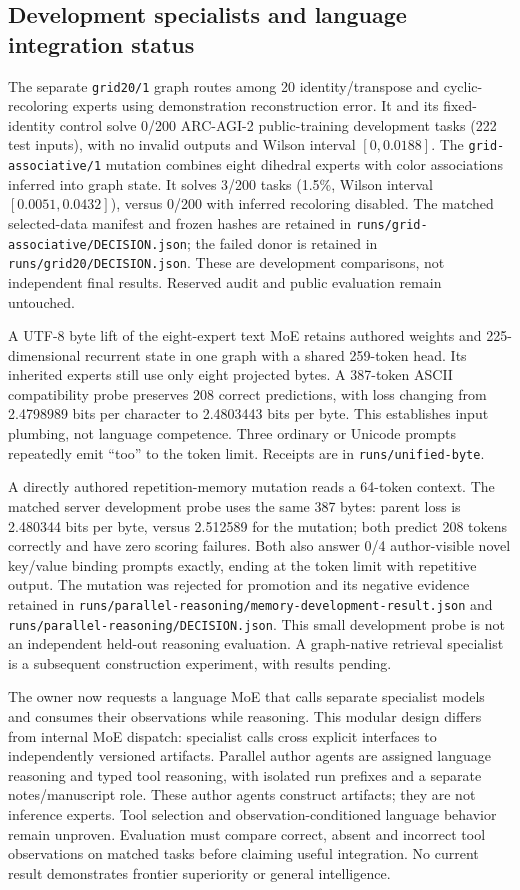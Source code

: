 \documentclass[11pt]{article}
\begin{document}
\subsection{Development specialists and language integration status}
The separate \texttt{grid20/1} graph routes among 20 identity/transpose and
cyclic-recoloring experts using demonstration reconstruction error. It and its
fixed-identity control solve 0/200 ARC-AGI-2 public-training development tasks
(222 test inputs), with no invalid outputs and Wilson interval $[0,0.0188]$.
The \texttt{grid-associative/1} mutation combines eight dihedral experts with
color associations inferred into graph state. It solves 3/200 tasks (1.5\%,
Wilson interval $[0.0051,0.0432]$), versus 0/200 with inferred recoloring disabled.
The matched selected-data manifest and frozen hashes are retained in
\texttt{runs/grid-associative/DECISION.json}; the failed donor is retained in
\texttt{runs/grid20/DECISION.json}. These are development comparisons, not
independent final results. Reserved audit and public evaluation remain untouched.

A UTF-8 byte lift of the eight-expert text MoE retains authored weights and
225-dimensional recurrent state in one graph with a shared 259-token head.
Its inherited experts still use only eight projected bytes. A 387-token ASCII
compatibility probe preserves 208 correct predictions, with loss changing from
2.4798989 bits per character to 2.4803443 bits per byte. This establishes input
plumbing, not language competence. Three ordinary or Unicode prompts repeatedly
emit ``too'' to the token limit. Receipts are in \texttt{runs/unified-byte}.

A directly authored repetition-memory mutation reads a 64-token context.
The matched server development probe uses the same 387 bytes: parent loss is
2.480344 bits per byte, versus 2.512589 for the mutation; both predict 208
tokens correctly and have zero scoring failures. Both also answer 0/4
author-visible novel key/value binding prompts exactly, ending at the token
limit with repetitive output. The mutation was rejected for promotion and its
negative evidence retained in
\texttt{runs/parallel-reasoning/memory-development-result.json} and
\texttt{runs/parallel-reasoning/DECISION.json}. This small development probe
is not an independent held-out reasoning evaluation. A graph-native retrieval
specialist is a subsequent construction experiment, with results pending.

The owner now requests a language MoE that calls separate specialist models
and consumes their observations while reasoning. This modular design differs
from internal MoE dispatch: specialist calls cross explicit interfaces to
independently versioned artifacts. Parallel author agents are assigned language
reasoning and typed tool reasoning, with isolated run prefixes and a separate
notes/manuscript role. These author agents construct artifacts; they are not
inference experts. Tool selection and observation-conditioned language behavior
remain unproven. Evaluation must compare correct, absent and incorrect tool
observations on matched tasks before claiming useful integration. No current
result demonstrates frontier superiority or general intelligence.
\end{document}
